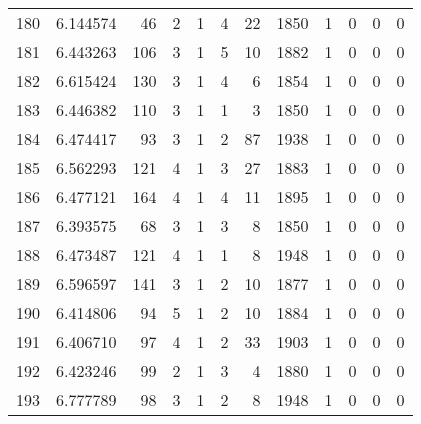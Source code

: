 \begin{tabular}{lrrrrrrrrrrr}
180 &  6.144574 &   46 &      2 &        1 &      4 &              22 &  1850 &               1 &               0 &               0 &               0 \\
181 &  6.443263 &  106 &      3 &        1 &      5 &              10 &  1882 &               1 &               0 &               0 &               0 \\
182 &  6.615424 &  130 &      3 &        1 &      4 &               6 &  1854 &               1 &               0 &               0 &               0 \\
183 &  6.446382 &  110 &      3 &        1 &      1 &               3 &  1850 &               1 &               0 &               0 &               0 \\
184 &  6.474417 &   93 &      3 &        1 &      2 &              87 &  1938 &               1 &               0 &               0 &               0 \\
185 &  6.562293 &  121 &      4 &        1 &      3 &              27 &  1883 &               1 &               0 &               0 &               0 \\
186 &  6.477121 &  164 &      4 &        1 &      4 &              11 &  1895 &               1 &               0 &               0 &               0 \\
187 &  6.393575 &   68 &      3 &        1 &      3 &               8 &  1850 &               1 &               0 &               0 &               0 \\
188 &  6.473487 &  121 &      4 &        1 &      1 &               8 &  1948 &               1 &               0 &               0 &               0 \\
189 &  6.596597 &  141 &      3 &        1 &      2 &              10 &  1877 &               1 &               0 &               0 &               0 \\
190 &  6.414806 &   94 &      5 &        1 &      2 &              10 &  1884 &               1 &               0 &               0 &               0 \\
191 &  6.406710 &   97 &      4 &        1 &      2 &              33 &  1903 &               1 &               0 &               0 &               0 \\
192 &  6.423246 &   99 &      2 &        1 &      3 &               4 &  1880 &               1 &               0 &               0 &               0 \\
193 &  6.777789 &   98 &      3 &        1 &      2 &               8 &  1948 &               1 &               0 &               0 &               0 \\

\end{tabular}
